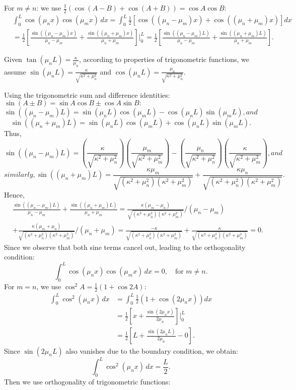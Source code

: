 \documentclass[letterpaper,12pt]{article}
\begin{document}
\begin{enumerate}[Q(1)]
For \( m \neq n \): we use $\frac{1}{2}(\cos(A-B)+\cos(A+B))=\cos A\cos B:$
\begin{align*}
&\int_0^L \cos(\mu_n x) \cos(\mu_m x) \,dx = \int_0^L \frac{1}{2} \left[ \cos((\mu_n - \mu_m)x) + \cos((\mu_n + \mu_m)x) \right] dx \\
&= \frac{1}{2} \left[ \frac{\sin((\mu_n - \mu_m)x)}{\mu_n - \mu_m} + \frac{\sin((\mu_n + \mu_m)x)}{\mu_n + \mu_m} \right] \Bigg|_0^L=\frac{1}{2} \left[ \frac{\sin((\mu_n - \mu_m)L)}{\mu_n - \mu_m} + \frac{\sin((\mu_n + \mu_m)L)}{\mu_n + \mu_m} \right] \Bigg.
\end{align*}



Given \( \tan(\mu_n L) = \frac{\kappa}{\mu_n} \), according to properties of trigonometric functions, we assume $\sin(\mu_nL)=\frac{\kappa}{\sqrt{\kappa^2+\mu_n^2}}$ and $\cos(\mu_nL)=\frac{\mu_n}{\sqrt{\kappa^2+\mu_n^2}}$.

Using the trigonometric sum and difference identities: $\sin(A \pm B) = \sin A \cos B \pm \cos A \sin B:$
\[
\sin((\mu_n - \mu_m)L) = \sin(\mu_n L) \cos(\mu_m L) - \cos(\mu_n L) \sin(\mu_m L), and
\]
\[
\sin((\mu_n + \mu_m)L) = \sin(\mu_n L) \cos(\mu_m L) + \cos(\mu_n L) \sin(\mu_m L).
\]
Thus,
\[
\sin((\mu_n - \mu_m)L) = \left( \frac{\kappa}{\sqrt{\kappa^2 + \mu_n^2}} \right) \left( \frac{\mu_m}{\sqrt{\kappa^2 + \mu_m^2}} \right) - \left( \frac{\mu_n}{\sqrt{\kappa^2 + \mu_n^2}} \right) \left( \frac{\kappa}{\sqrt{\kappa^2 + \mu_m^2}} \right), and 
\]
\[
similarly, \sin((\mu_n + \mu_m)L) = \frac{\kappa \mu_m}{\sqrt{(\kappa^2 + \mu_n^2)(\kappa^2 + \mu_m^2)}} + \frac{\kappa \mu_n}{\sqrt{(\kappa^2 + \mu_n^2)(\kappa^2 + \mu_m^2)}}.
\]
Hence,
\begin{align*}
    &\frac{\sin((\mu_n - \mu_m)L)}{\mu_n - \mu_m} + \frac{\sin((\mu_n + \mu_m)L)}{\mu_n + \mu_m} = \frac{\kappa(\mu_m-\mu_n)}{\sqrt{(\kappa^2+\mu_n^2)(\kappa^2+\mu_m^2)}}/(\mu_n-\mu_m) \\
    &+ \frac{\kappa(\mu_m+\mu_n)}{\sqrt{(\kappa^2+\mu_n^2)(\kappa^2+\mu_m^2)}}/(\mu_n+\mu_m)=\frac{-\kappa}{\sqrt{(\kappa^2+\mu_n^2)(\kappa^2+\mu_m^2)}} + \frac{\kappa}{\sqrt{(\kappa^2+\mu_n^2)(\kappa^2+\mu_m^2)}}=0.
\end{align*}
Since we observe that both sine terms cancel out, leading to the orthogonality condition:
\[
\int_0^L \cos(\mu_n x) \cos(\mu_m x) \,dx = 0, \quad \text{for } m \neq n.
\]
For \( m = n \), we use $\cos^2 A = \frac{1}{2} (1 + \cos 2A):$
\begin{align*}
\int_0^L \cos^2(\mu_n x) \,dx &= \int_0^L \frac{1}{2} \left( 1 + \cos(2\mu_n x) \right) dx \\
&= \frac{1}{2} \left[ x + \frac{\sin(2\mu_n x)}{2\mu_n} \right] \Bigg|_0^L \\
&= \frac{1}{2} \left[ L + \frac{\sin(2\mu_n L)}{2\mu_n} - 0 \right].
\end{align*}
Since \(\sin(2\mu_n L)\) also vanishes due to the boundary condition, we obtain:
\[
\int_0^L \cos^2(\mu_n x) \,dx = \frac{L}{2}.
\]
Then we use orthogonality of trigonometric functions:


\end{enumerate}
\end{document}
